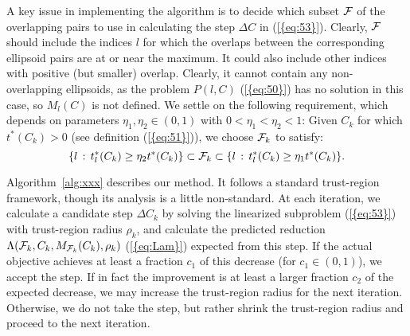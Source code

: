 \documentclass{siamltex}
\begin{document}
A key issue in implementing the algorithm is to decide which subset
${{\cal F}}$ of the overlapping pairs to use in calculating the step ${\Delta C}$ in
{(\ref{{eq:53}})}. Clearly, ${{\cal F}}$ should include the indices $l$ for which
the overlaps between the corresponding ellipsoid pairs are at or near
the maximum. It could also include other indices with positive (but
smaller) overlap. Clearly, it cannot contain any non-overlapping
ellipsoids, as the problem $P(l,C)$ {(\ref{{eq:50}})} has no solution in
this case, so $M_l(C)$ is not defined. We settle on the following
requirement, which depends on parameters $\eta_1, \eta_2 \in (0,1)$
with $0 < \eta_1 < \eta_2 <1$: Given $C_k$ for which $t^*(C_k)>0$ (see
definition {(\ref{{eq:51}})}), we choose ${{\cal F}}_k$ to satisfy:
\begin{equation} \label{eq:Fk}
\{ l \, : \, t^*_l(C_k)  \ge \eta_2 t^*(C_k) \} \subset {{\cal F}}_k \subset
\{ l \, : \, t^*_l(C_k) \ge \eta_1 t^*(C_k) \}.
\end{equation}

Algorithm~\ref{alg:xxx} describes our method. It follows a standard
trust-region framework, though its analysis is a little
non-standard. At each iteration, we calculate a candidate step ${\Delta C}_k$
by solving the linearized subproblem {(\ref{{eq:53}})} with trust-region
radius $\rho_k$, and calculate the predicted reduction
$\Lambda({{\cal F}}_k,C_k, M_{{{\cal F}}_k}(C_k), \rho_k)$ {(\ref{{eq:Lam}})} expected
from this step. If the actual objective achieves at least a fraction
$c_1$ of this decrease (for $c_1 \in (0,1)$), we accept the step. If
in fact the improvement is at least a larger fraction $c_2$ of the
expected decrease, we may increase the trust-region radius for the
next iteration.  Otherwise, we do not take the step, but rather shrink
the trust-region radius and proceed to the next iteration.
\end{document}
